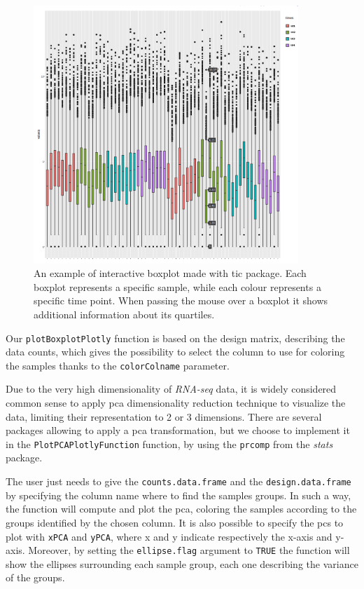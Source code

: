 \begin{figure}[H]
\centering
\includegraphics[width=10cm, keepaspectratio]{img/ticorser/boxplot_example.png}
\caption[ticorser boxplot]{An example of interactive boxplot made with \gls{tic} package. Each boxplot represents a specific sample, while each colour represents a specific time point. When passing the mouse over a boxplot it shows additional information about its quartiles.}
\label{fig:ticorserboxplot}

\end{figure}

Our \lstinline!plotBoxplotPlotly! function is based on the design matrix, describing the data counts, which gives the possibility to select the column to use for coloring the samples thanks to the \lstinline!colorColname! parameter. 

Due to the very high dimensionality of \textit{RNA-seq} data, it is widely considered common sense to apply \gls{pca} dimensionality reduction technique to visualize the data, limiting their representation to 2 or 3 dimensions.
There are several packages allowing to apply a \gls{pca} transformation, but we choose to implement it in the \lstinline!PlotPCAPlotlyFunction! function, by using the \lstinline!prcomp! from the \textit{stats} package.

The user just needs to give the \lstinline!counts.data.frame! and the \lstinline!design.data.frame! by specifying the column name where to find the samples groups.
In such a way, the function will compute and plot the \gls{pca}, coloring the samples according to the groups identified by the chosen column.
It is also possible to specify the \glspl{pc} to plot with \lstinline!xPCA! and \lstinline!yPCA!, where x and y indicate respectively the x-axis and y-axis.
Moreover, by setting the \lstinline!ellipse.flag! argument to \lstinline!TRUE!  the function will show the ellipses surrounding each sample group, each one describing the variance of the groups.


